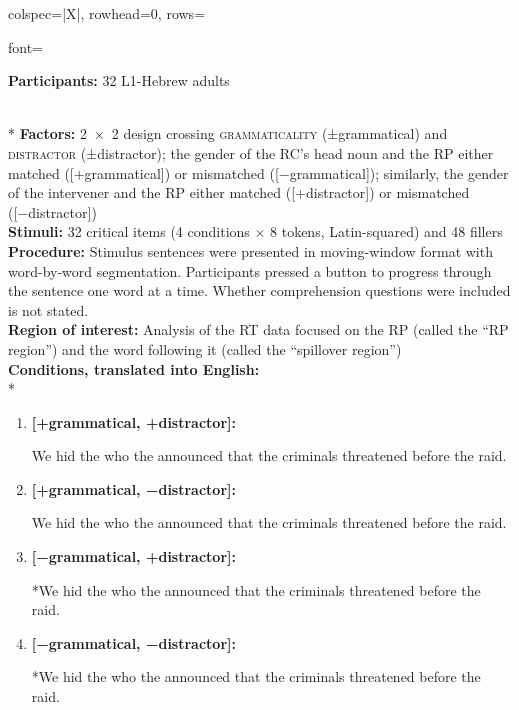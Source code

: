 \begin{longtblr}[caption={\textcite{keshev.etal2019}: Self-paced reading task in Experiment 1}, label={tblr:keshev}]{colspec={|X|}, rowhead=0, rows={font=\raggedright{}}}\hline
\textbf{Participants:} 32 L1-Hebrew adults \vspace{5pt}\rule{0pt}{10pt}\\*
\textbf{Factors:} 2~×~2 design crossing \textsc{grammaticality} (±grammatical) and \textsc{distractor} (±distractor); the gender of the RC's head noun and the RP either matched ([+grammatical]) or mismatched ([−grammatical]); similarly, the gender of the intervener and the RP either matched ([+distractor]) or mismatched ([−distractor]) \vspace{5pt}\\
\textbf{Stimuli:} 32 critical items (4 conditions × 8 tokens, Latin-squared) and 48 fillers \vspace{5pt}\\
\textbf{Procedure:} Stimulus sentences were presented in moving-window format with word-by-word segmentation. Participants pressed a button to progress through the sentence one word at a time. Whether comprehension questions were included is not stated. \vspace{5pt}\\
\textbf{Region of interest:} Analysis of the RT data focused on the RP (called the ``RP region'') and the word following it (called the ``spillover region'') \vspace{5pt}\\
\textbf{Conditions, translated into English:} \vspace{5pt}\\*
\begin{varwidth}{\linewidth}\begin{enumerate}[\bfseries (a),itemsep=5pt] 
\item \textbf{[+grammatical, +distractor]:}\par\nobreak
\phantom{*}We hid the  who the  announced that the criminals threatened  \phantom{*}before the raid.
\item \textbf{[+grammatical, −distractor]:}\par\nobreak
\phantom{*}We hid the  who the  announced that the criminals threatened  \phantom{*}before the raid.
\item \textbf{[−grammatical, +distractor]:}\par\nobreak
*We hid the  who the  announced that the criminals threatened  \phantom{*}before the raid.
\item \textbf{[−grammatical, −distractor]:}\par\nobreak
*We hid the  who the  announced that the criminals threatened  \phantom{*}before the raid.
\end{enumerate}\end{varwidth}\\\hline
\end{longtblr}

